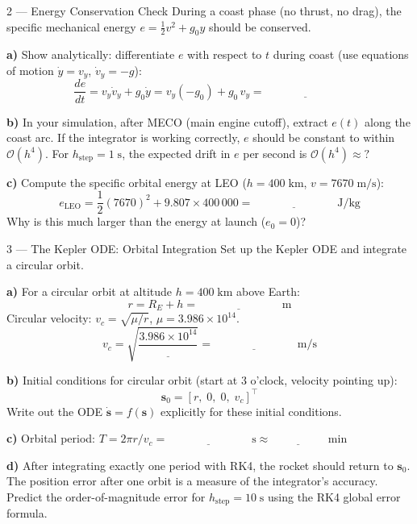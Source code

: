\documentclass[12pt, a4paper]{article}
\begin{document}
\begin{exercisebox}{2 — Energy Conservation Check}
During a coast phase (no thrust, no drag), the specific mechanical energy
$e = \frac{1}{2}v^2 + g_0 y$ should be conserved.

\textbf{a)} Show analytically: differentiate $e$ with respect to $t$ during coast
(use equations of motion $\dot{y} = v_y$, $\dot{v}_y = -g$):
\[
  \frac{de}{dt} = v_y\dot{v}_y + g_0\dot{y} = v_y(-g_0) + g_0\,v_y = \underline{\hspace{3cm}}
\]

\textbf{b)} In your simulation, after MECO (main engine cutoff), extract $e(t)$ along the coast arc.
If the integrator is working correctly, $e$ should be constant to within $\mathcal{O}(h^4)$.
For $h_\text{step} = 1\;\text{s}$, the expected drift in $e$ per second is $\mathcal{O}(h^4) \approx ?$

\textbf{c)} Compute the specific orbital energy at LEO ($h = 400\;\text{km}$, $v = 7670\;\text{m/s}$):
\[
  e_\text{LEO} = \frac{1}{2}(7670)^2 + 9.807\times 400\,000 = \underline{\hspace{3cm}}\;\text{J/kg}
\]
Why is this much larger than the energy at launch ($e_0 = 0$)?
\end{exercisebox}

\begin{solutionspace}[7cm]
\end{solutionspace}

\begin{exercisebox}{3 — The Kepler ODE: Orbital Integration}
Set up the Kepler ODE and integrate a circular orbit.

\textbf{a)} For a circular orbit at altitude $h = 400\;\text{km}$ above Earth:
\[
  r = R_E + h = \underline{\hspace{3cm}}\;\text{m}
\]
Circular velocity: $v_c = \sqrt{\mu/r}$, $\mu = 3.986\times 10^{14}$.
\[
  v_c = \sqrt{\frac{3.986\times 10^{14}}{\underline{\hspace{2cm}}}} = \underline{\hspace{3cm}}\;\text{m/s}
\]

\textbf{b)} Initial conditions for circular orbit (start at 3 o'clock, velocity pointing up):
\[
  \mathbf{s}_0 = [r,\; 0,\; 0,\; v_c]^\top
\]
Write out the ODE $\dot{\mathbf{s}} = f(\mathbf{s})$ explicitly for these initial conditions.

\textbf{c)} Orbital period: $T = 2\pi r / v_c = \underline{\hspace{3cm}}\;\text{s} \approx \underline{\hspace{2cm}}\;\text{min}$

\textbf{d)} After integrating exactly one period with RK4, the rocket should return to $\mathbf{s}_0$.
The position error after one orbit is a measure of the integrator's accuracy.
Predict the order-of-magnitude error for $h_\text{step} = 10\;\text{s}$ using the RK4 global error formula.
\end{exercisebox}
\end{document}
